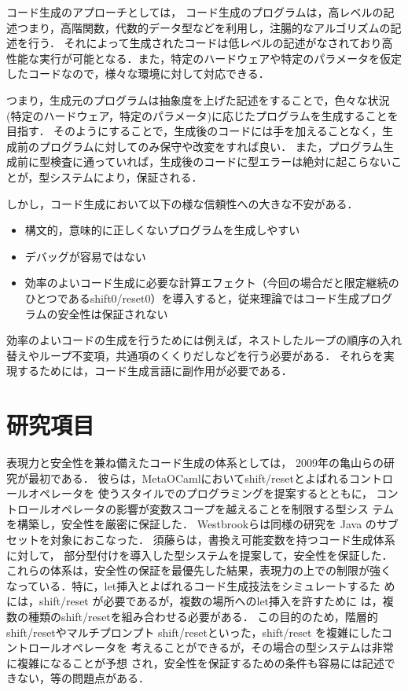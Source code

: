 \documentclass[10pt,a4j,twocolumn]{jarticle}
\theoremstyle{definition}
\begin{document}
コード生成のアプローチとしては，
コード生成のプログラムは，高レベルの記述つまり，高階関数，代数的データ型などを利用し，注腸的なアルゴリズムの記述を行う．
それによって生成されたコードは低レベルの記述がなされており高性能な実行が可能となる．また，特定のハードウェアや特定のパラメータを仮定したコードなので，様々な環境に対して対応できる．

つまり，生成元のプログラムは抽象度を上げた記述をすることで，色々な状況(特定のハードウェア，特定のパラメータ)に応じたプログラムを生成することを目指す．
そのようにすることで，生成後のコードには手を加えることなく，生成前のプログラムに対してのみ保守や改変をすれば良い．
また，プログラム生成前に型検査に通っていれば，生成後のコードに型エラーは絶対に起こらないことが，型システムにより，保証される．

しかし，コード生成において以下の様な信頼性への大きな不安がある．

\begin{itemize}
\item 構文的，意味的に正しくないプログラムを生成しやすい
\item デバッグが容易ではない
\item 効率のよいコード生成に必要な計算エフェクト（今回の場合だと限定継続のひとつであるshift0/reset0）を導入すると，従来理論ではコード生成プログラムの安全性は保証されない
\end{itemize}

効率のよいコードの生成を行うためには例えば，ネストしたループの順序の入れ替えやループ不変項，共通項のくくりだしなどを行う必要がある．
それらを実現するためには，コード生成言語に副作用が必要である．

\section{研究項目}
表現力と安全性を兼ね備えたコード生成の体系としては，
2009年の亀山らの研究\cite{Kameyama2009}が最初である．
彼らは，MetaOCamlにおいてshift/resetとよばれるコントロールオペレータを
使うスタイルでのプログラミングを提案するとともに，
コントロールオペレータの影響が変数スコープを越えることを制限する型シス
テムを構築し，安全性を厳密に保証した．
Westbrookら\cite{Westbrook}は同様の研究を Java のサブセットを対象におこなった．
須藤ら\cite{Sudo2014}は，書換え可能変数を持つコード生成体系に対して，
部分型付けを導入した型システムを提案して，安全性を保証した．
これらの体系は，安全性の保証を最優先した結果，表現力の上での制限が強く
なっている．特に，let挿入とよばれるコード生成技法をシミュレートするた
めには，shift/reset が必要であるが，複数の場所へのlet挿入を許すために
は，複数の種類のshift/resetを組み合わせる必要がある．
この目的のため，階層的shift/resetやマルチプロンプト
shift/resetといった，shift/reset を複雑にしたコントロールオペレータを
考えることができるが，その場合の型システムは非常に複雑になることが予想
され，安全性を保証するための条件も容易には記述できない，等の問題点がある．
\end{document}
